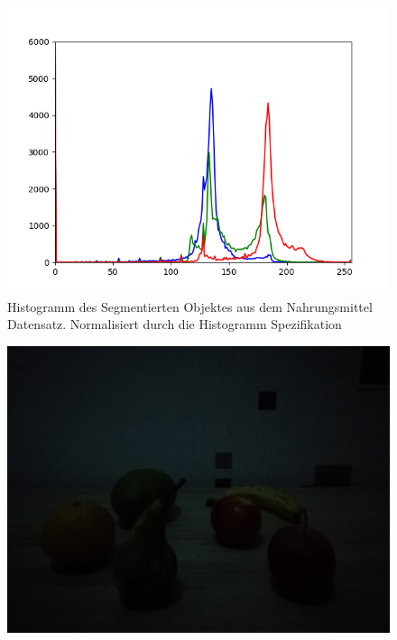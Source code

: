 \begin{appendices}
\begin{figure}[htb]
\begin{minipage}[c]{0.08\textwidth}
\end{minipage}
\hfill
\begin{minipage}[c]{0.3\textwidth}
\includegraphics[width=\textwidth]{Sources/Bild3_HS_histo.png}
\end{minipage}
\caption{Histogramm des Segmentierten Objektes aus dem Nahrungsmittel Datensatz. Normalisiert durch die Histogramm Spezifikation}
\label{img:evalHS}
\end{figure}
\begin{figure}[htbp]
\center
\begin{minipage}{0.49\textwidth}
\includegraphics[width=.8\textwidth]{Sources/Anhang/resize_0250.jpg}
\end{minipage}
\begin{minipage}{0.49\textwidth}

\end{minipage}
\end{figure}
\end{appendices}
